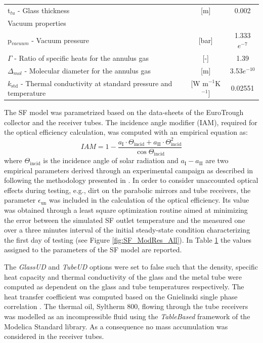 \documentclass[final,3p,times,review]{elsarticle}
\begin{document}
\begin{table}[h!]
\begin{tabularx}{\textwidth}{Xcc}
		\hspace*{0.3cm} t$_{tu}$ - Glass thickness  & [m] & 0.002\\
		Vacuum properties &  &  \\
		\hspace*{0.3cm} p$_{vacuum}$ - Vacuum pressure & [bar] & 1.333$e^{-7}$\\
		\hspace*{0.3cm} $\Gamma$ - Ratio of specific heats for the annulus gas & [-] & 1.39\\
		\hspace*{0.3cm} $\Delta_{mol}$ - Molecular diameter for the annulus gas & [m] & 3.53$e^{-10}$\\
		\hspace*{0.3cm} $k_\mathrm{std}$ - Thermal conductivity at standard pressure and temperature & [W m$^{-1}$K$^{-1}$] & 0.02551\\
		\bottomrule
	\end{tabularx}%
	\label{tab:SF_parameter}%
\end{table}%
%
The SF model was parametrized based on the data-sheets of the EuroTrough collector and the receiver tubes. The incidence angle modifier (IAM), required for the optical efficiency calculation, was computed with an empirical equation as:
%
\begin{equation}
IAM = 1 - \frac{a_\mathrm{I} \cdot \Theta_\mathrm{incid} + a_\mathrm{II}\cdot \Theta_\mathrm{incid}^2}{\cos{\Theta_\mathrm{incid}}}
\end{equation} 
%
where $\Theta_\mathrm{incid}$ is the incidence angle of solar radiation and $a_\mathrm{I}-a_\mathrm{II}$ are two empirical parameters derived through an experimental campaign as described in \cite{Sallaberry2016} following the methodology presented in \cite{Valenzuela2014}. In order to consider unaccounted optical effects during testing, e.g., dirt on the parabolic mirrors and tube receivers, the parameter $\epsilon_\mathrm{un}$ was included in the calculation of the optical efficiency. Its value was obtained through a least square optimization routine aimed at minimizing the error between the simulated SF outlet temperature and the measured one over a three minutes interval  of the initial steady-state condition characterizing the first day of testing (see Figure \ref{fig:SF_ModRes_All}). In Table \ref{tab:SF_parameter} the values assigned to the parameters of the SF model are reported.
%

%
The \textit{GlassUD} and \textit{TubeUD} options were set to false such that the density, specific heat capacity and thermal conductivity of the glass and the metal tube were computed as dependent on the glass and tube temperatures respectively.
The heat transfer coefficient was computed based on the Gnielinski single phase correlation \cite{Gnielinski2010}.
The thermal oil, Syltherm 800, flowing through the tube receivers was modelled as an incompressible fluid using the \textit{TableBased} framework of the Modelica Standard library. As a consequence no mass accumulation was considered in the receiver tubes.
\end{document}
